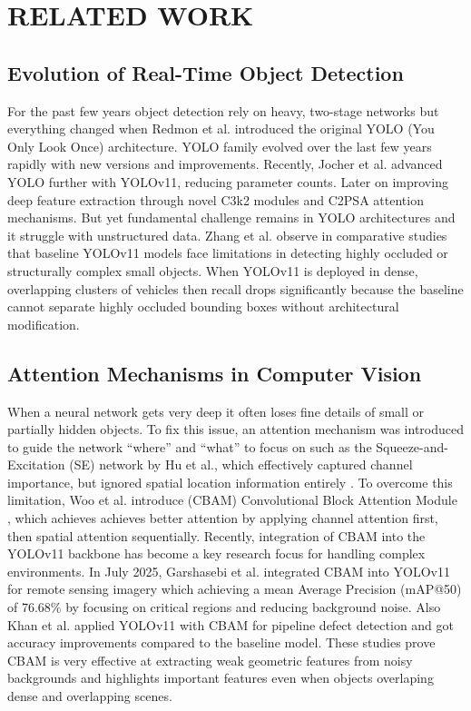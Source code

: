 \documentclass[conference]{IEEEtran}
\begin{document}
\section{RELATED WORK}

\subsection{Evolution of Real-Time Object Detection}

For the past few years object detection rely on heavy, two-stage networks but everything changed when Redmon et al. introduced the original YOLO (You Only Look Once) architecture\cite{redmon2016you}. YOLO family evolved over the last few years rapidly with new versions and improvements. Recently, Jocher et al. advanced YOLO further with YOLOv11, reducing parameter counts\cite{Jocher2025YOLOv11}. Later on improving deep feature extraction through novel C3k2 modules and C2PSA attention mechanisms\cite{9a}. But yet fundamental challenge remains in YOLO architectures and it struggle with unstructured data. Zhang et al. observe in comparative studies that baseline YOLOv11 models face limitations in detecting highly occluded or structurally complex small objects\cite{zhang2025trinext}. When YOLOv11 is deployed in dense, overlapping clusters of vehicles then recall drops significantly because the baseline cannot separate highly occluded bounding boxes without architectural modification.

\subsection{Attention Mechanisms in Computer Vision}
When a neural network gets very deep it often loses fine details of small or partially hidden objects. To fix this issue, an attention mechanism was introduced to guide the network “where” and “what” to focus on such as the Squeeze-and-Excitation (SE) network by Hu et al., which effectively captured channel importance, but ignored spatial location information entirely \cite{11a}. To overcome this limitation, Woo et al. introduce (CBAM) Convolutional Block Attention Module \cite{Woo2018CBAM}, which achieves achieves better attention by applying channel attention first, then spatial attention sequentially. Recently, integration of CBAM into the YOLOv11 backbone has become a key research focus for handling complex environments. In July 2025, Garshasebi et al.\cite{garshasebi2025improving} integrated CBAM into YOLOv11 for remote sensing imagery which achieving a mean Average Precision (mAP@50) of 76.68\% by focusing on critical regions and reducing background noise. Also Khan et al. applied YOLOv11 with CBAM for pipeline defect detection and got accuracy improvements compared to the baseline model\cite{Rahman2021YOLOv5}. These studies prove CBAM is very effective at extracting weak geometric features from noisy backgrounds and highlights important features even when objects overlaping dense and overlapping scenes.
\end{document}
